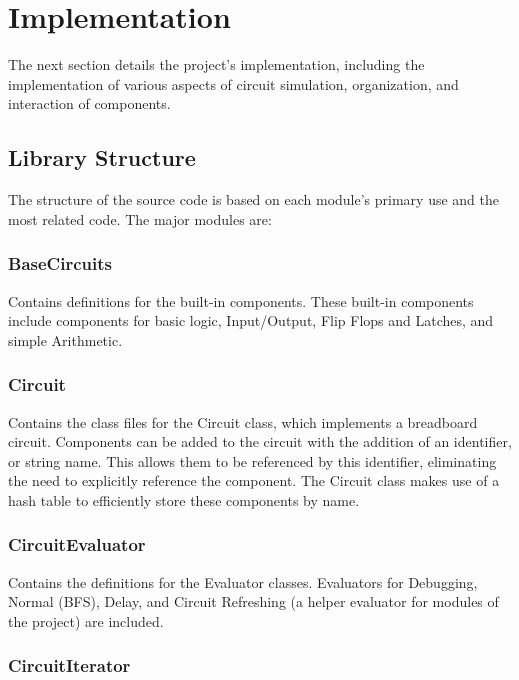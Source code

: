 \documentclass{article}
\begin{document}
\section{Implementation}

The next section details the project’s implementation, including the implementation of various aspects of circuit simulation, organization, and interaction of components.

\subsection{Library Structure}

The structure of the source code is based on each module’s primary use and the most related code. The major modules are:

\subsubsection{BaseCircuits}

Contains definitions for the built-in components. These built-in components include components for basic logic, Input/Output, Flip Flops and Latches, and simple Arithmetic.

\subsubsection{Circuit}

Contains the class files for the Circuit class, which implements a breadboard circuit. Components can be added to the circuit with the addition of an identifier, or string name. This allows them to be referenced by this identifier, eliminating the need to explicitly reference the component. The Circuit class makes use of a hash table to efficiently store these components by name.

\subsubsection{CircuitEvaluator}

Contains the definitions for the Evaluator classes. Evaluators for Debugging, Normal (BFS), Delay, and Circuit Refreshing (a helper evaluator for modules of the project) are included.

\subsubsection{CircuitIterator}
\end{document}
